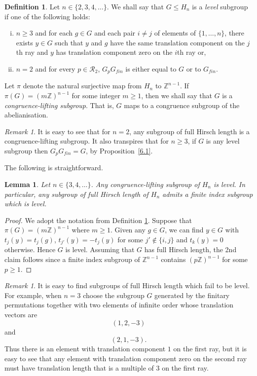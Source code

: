 \documentclass[11pt,a4paper]{amsart}
\newtheorem{lemma}[theorem]{Lemma}
\theoremstyle{definition}
\newtheorem{definition}[theorem]{Definition}
\theoremstyle{remark}
\newtheorem{remark}[theorem]{Remark}
\newcommand{\Z}{\mathbb Z}
\newcommand{\Ra}{\mathcal{R}}
\newcommand{\gfin}{G_{\textit{fin}}}
\begin{document}
\begin{definition}
	\label{level}
	Let $n\in \{2, 3, 4,\ldots\}$. We shall say that $G\le H_n$ is a \emph{level} subgroup if one of the following holds:
\begin{enumerate}[(i)]
	\item $n \geq 3$ and for each $g\in G$ and each pair $i\ne j$ of elements of $\{1,\ldots,n\}$, there exists $y\in G$ such that $y$ and $g$ have the same translation component on the $j$th ray and $y$ has translation component zero on the $i$th ray or, 
	\item $n=2$ and  for every $p \in \Ra_2$, $G_p \gfin$ is either equal to $G$ or to $\gfin$.  
\end{enumerate}

	Let $\pi$ denote the natural surjective map from $H_n$ to $\Z^{n-1}$. If $\pi(G)=(m\Z)^{n-1}$ for some integer $m\ge 1$, then we shall say that $G$ is a \emph{congruence-lifting subgroup}. That is, $G$ maps to a congruence subgroup of the abelianisation. 
\end{definition}

\begin{remark}
	It is easy to see that for $n=2$, any subgroup of full Hirsch length is a congruence-lifting subgroup. It also transpires that for $n \geq 3$, if $G$ is any level subgroup then $G_p \gfin = G$, by Proposition~\ref{6.1}.  
\end{remark}

The following is straightforward.

\begin{lemma}
	\label{level for n>3}
	Let $n\in \{3, 4,\ldots\}$. Any congruence-lifting subgroup of $H_n$ is level. In particular, any subgroup of full Hirsch length of $H_n$ admits a finite index subgroup which is level. 
\end{lemma}
\begin{proof}
We adopt the notation from Definition \ref{level}. Suppose that $\pi(G)=(m\Z)^{n-1}$ where $m\ge 1$. Given any $g\in G$, we can find $y\in G$ with $t_j(y)=t_j(g)$, $t_{j'}(y)=-t_j(y)$ for some $j'\not\in\{i, j\}$ and $t_k(y)=0$ otherwise. Hence $G$ is level. Assuming that $G$ has full Hirsch length, the 2nd claim follows since a finite index subgroup of $\Z^{n-1}$ contains $(p\Z)^{n-1}$ for some $p\ge 1$.
\end{proof}

\begin{remark}
It is easy to find subgroups of full Hirsch length which fail to be level. For example, when $n=3$ choose the subgroup $G$ generated by the finitary permutations together with two elements of infinite order whose translation vectors are
	$$(1,2,-3)$$
	and $$(2,1,-3).$$
	Thus there is an element with translation component $1$ on the first ray, but it is easy to see that any element with translation component zero on the second ray must have translation length that is a multiple of $3$ on the first ray.
\end{remark}
\end{document}
